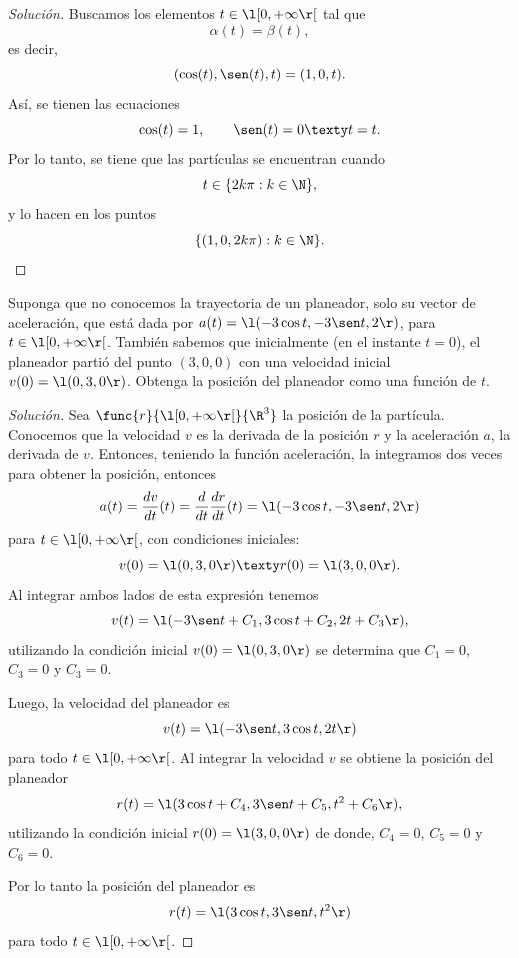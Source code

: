 \documentclass[a4,11pt]{aleph-notas}
\begin{document}
\begin{proof}[Solución]
Buscamos los elementos $t\in \l[0,+\infty\r[$ tal que
    \[
        \alpha(t)=\beta(t),
    \]
    es decir,
    \[
       (\cos(t),\sen(t),t)=(1,0,t).
    \]
    Así, se tienen las ecuaciones
    \[
        \cos(t)=1,
        \qquad
        \sen(t)=0
        \texty
        t=t.
    \]
    Por lo tanto, se tiene que las partículas se encuentran cuando
    \[
        t\in\{2k\pi:k\in\N\},
    \]
    y lo hacen en los puntos 
    \[
        \{(1,0,2k\pi):k\in\N\}.\qedhere
    \]
\end{proof}

\begin{ejer}
Suponga que no conocemos la trayectoria de un planeador, solo su vector de
aceleración, que está dada por $a(t)= \l(-3 \cos t, -3 \sen t, 2 \r)$, para $t\in \l[0,+\infty\r[$. También sabemos que inicialmente
(en el instante $t=0$), el planeador partió del punto $(3, 0, 0)$ con una velocidad inicial $v(0)=\l(0,3,0\r)$. Obtenga la posición del planeador como una función de $t$.
\end{ejer}

\begin{proof}[Solución]
Sea $\func{r}{\l[0,+\infty\r[}{\R^3}$ la posición de la partícula. Conocemos que la velocidad $v$ es la derivada de la posición $r$ y la aceleración $a$, la derivada de $v$. Entonces, teniendo la función aceleración, la integramos dos veces para obtener la posición, entonces
    \[
        a(t)=\dfrac{dv}{dt}(t)=\dfrac{d}{dt}\dfrac{dr}{dt}(t)= \l(-3 \cos t, -3 \sen t, 2 \r)
    \]
    para $t\in\l[0,+\infty\r[$, con condiciones iniciales:
    \[
        v(0)= \l(0,3,0\r)
        \texty
        r(0)= \l(3,0,0\r).
    \]
    Al integrar ambos lados de esta expresión tenemos
    \[
        v(t)= \l(-3 \sen t+C_1, 3 \cos t+C_2, 2t +C_3 \r),
    \]
    utilizando la condición inicial $v(0)= \l(0,3,0\r)$ se determina que $C_1=0$, $C_3=0$ y $C_3=0$.

    Luego, la velocidad del planeador es
    \[
        v(t)= \l(-3 \sen t, 3 \cos t, 2t \r)
    \]
    para todo $t\in\l[0,+\infty\r[$. Al integrar la velocidad $v$ se obtiene la posición del planeador
    \[
        r(t)= \l(3 \cos t + C_4, 3 \sen t + C_5, t^2 + C_6 \r),
    \]
    utilizando la condición inicial $r(0)= \l(3,0,0\r)$ de donde, $C_4=0$, $C_5=0$ y $C_6=0$.

    Por lo tanto la posición del planeador es
    \[
        r(t)= \l(3 \cos t, 3 \sen t, t^2\r)
    \]
    para todo $t\in\l[0,+\infty\r[$.
\end{proof}
\end{document}
